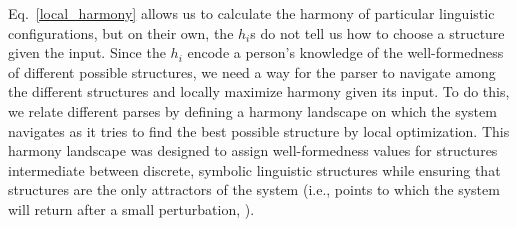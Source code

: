 \documentclass[10pt,letterpaper]{article}
\begin{document}
Eq.~\ref{local_harmony} allows us to calculate the harmony of particular linguistic configurations, but on their own, the $h_i$s do not tell us how to choose a structure given the input. Since the $h_i$ encode a person's knowledge of the well-formedness of different possible structures, we need a way for the parser to navigate among the different structures and locally maximize harmony given its input. To do this, we relate different parses by defining a harmony landscape on which the system navigates as it tries to find the best possible structure by local optimization. This harmony landscape was designed to assign well-formedness values for structures intermediate between discrete, symbolic linguistic structures while ensuring that  structures are the only attractors of the system (i.e., points to which the system will return after a small perturbation, ). %
\end{document}
